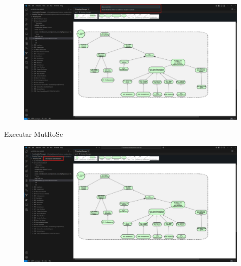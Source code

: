 \documentclass{beamer}
\begin{document}
\begin{frame}
  \begin{figure}[!h]
    \centering
    \includegraphics[width=1\textwidth]{flow2.png} 
    \caption{}
  \end{figure}
\end{frame}
\begin{frame}{Executar MutRoSe}
  \begin{figure}[!h]
    \centering
    \includegraphics[width=1\textwidth]{decompose.png} 
    \caption{}
  \end{figure}
\end{frame}
\end{document}
